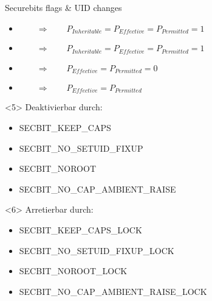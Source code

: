 \documentclass[usenames,dvipsnames,10pt]{beamer}
\begin{document}
\begin{frame}{Securebits flags \& UID changes}
	
	\begin{itemize}[<+->]
	\item {} $\qquad \Rightarrow \qquad P_{Inheritable} = P_{Effective} = P_{Permitted} = 1$
	\item {} $\qquad \Rightarrow \qquad P_{Inheritable} = P_{Effective} = P_{Permitted} = 1$
	\item {} $\qquad \Rightarrow \qquad P_{Effective} = P_{Permitted} = 0$ 
	\item {} $\qquad \Rightarrow \qquad P_{Effective} = P_{Permitted}$ 
	\end{itemize}
	
	\begin{onlyenv}
	Deaktivierbar durch:
	
		\begin{itemize}
		\item SECBIT\_KEEP\_CAPS
		\item SECBIT\_NO\_SETUID\_FIXUP
		\item SECBIT\_NOROOT
		\item SECBIT\_NO\_CAP\_AMBIENT\_RAISE
		\end{itemize}
	\end{onlyenv}
	\begin{onlyenv}
	Arretierbar durch:
	
		\begin{itemize}
		\item SECBIT\_KEEP\_CAPS{\color{red}\_LOCK}
		\item SECBIT\_NO\_SETUID\_FIXUP{\color{red}\_LOCK}
		\item SECBIT\_NOROOT{\color{red}\_LOCK}
		\item SECBIT\_NO\_CAP\_AMBIENT\_RAISE{\color{red}\_LOCK}
		\end{itemize}
	\end{onlyenv}

\end{frame}
\end{document}
